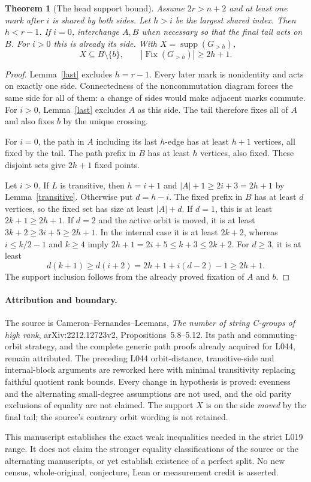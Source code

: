 \documentclass[11pt,a4paper]{article}
\newtheorem{theorem}[lemma]{Theorem}
\begin{document}
\begin{theorem}[The head support bound]\label{head}
Assume $2r>n+2$ and at least one mark after $i$ is shared
by both sides. Let $h>i$ be the largest shared index.
Then $h<r-1$. If $i=0$, interchange $A,B$ when necessary
so that the final tail acts on $B$. For $i>0$ this is
already its side. With $X=\operatorname{supp}(G_{>h})$,
\[
             X\subseteq B\setminus\{b\},\qquad
             |\operatorname{Fix}(G_{>h})|\ge2h+1.
\]
\end{theorem}
\begin{proof}
Lemma~\ref{last} excludes $h=r-1$. Every later mark is
nonidentity and acts on exactly one side. Connectedness
of the noncommutation diagram forces the same side for
all of them: a change of sides would make adjacent marks
commute. For $i>0$, Lemma~\ref{last} excludes $A$ as this
side. The tail therefore fixes all of $A$ and also fixes
$b$ by the unique crossing.

For $i=0$, the path in $A$ including its last $h$-edge has
at least $h+1$ vertices, all fixed by the tail. The path
prefix in $B$ has at least $h$ vertices, also fixed. These
disjoint sets give $2h+1$ fixed points.

Let $i>0$. If $L$ is transitive, then $h=i+1$ and
$|A|+1\ge2i+3=2h+1$ by Lemma~\ref{transitive}.
Otherwise put $d=h-i$. The fixed prefix in $B$ has at
least $d$ vertices, so the fixed set has size at least
$|A|+d$. If $d=1$, this is at least $2k+1\ge2h+1$.
If $d=2$ and the active orbit is moved, it is at least
$3k+2\ge3i+5\ge2h+1$. In the internal case it is at
least $2k+2$, whereas $i\le k/2-1$ and $k\ge4$ imply
$2h+1=2i+5\le k+3\le2k+2$.
For $d\ge3$, it is at least
\[
 d(k+1)\ge d(i+2)=2h+1+i(d-2)-1\ge2h+1.
\]
The support inclusion follows from the already proved
fixation of $A$ and $b$.
\end{proof}

\paragraph{Attribution and boundary.}
The source is Cameron--Fernandes--Leemans,
\emph{The number of string C-groups of high rank},
arXiv:2212.12723v2, Propositions~5.8--5.12. Its path and
commuting-orbit strategy, and the complete generic path proofs
already acquired for L044, remain attributed. The preceding
L044 orbit-distance, transitive-side and internal-block arguments
are reworked here with minimal transitivity replacing faithful
quotient rank bounds. Every change in hypothesis is proved:
evenness and the alternating small-degree assumptions are not
used, and the old parity exclusions of equality are not claimed.
The support $X$ is on the side \emph{moved} by the final tail;
the source's contrary orbit wording is not retained.

This manuscript establishes the exact weak inequalities needed
in the strict L019 range. It does not claim the stronger equality
classifications of the source or the alternating manuscripts,
or yet establish existence of a perfect split. No new census,
whole-original, conjecture, Lean or measurement credit is asserted.
\end{document}
